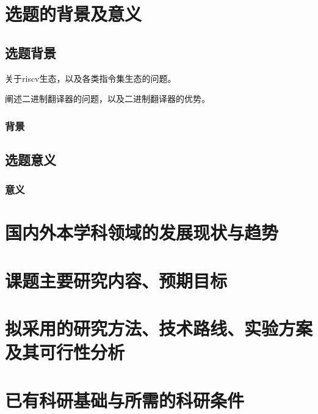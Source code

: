 \section{选题的背景及意义}

\subsection{选题背景}

关于riscv生态，以及各类指令集生态的问题。

阐述二进制翻译器的问题，以及二进制翻译器的优势。



\subsubsection{背景}


\subsection{选题意义}



\subsubsection{意义}



\section{国内外本学科领域的发展现状与趋势}



\section{课题主要研究内容、预期目标}



\section{拟采用的研究方法、技术路线、实验方案及其可行性分析}



\section{已有科研基础与所需的科研条件}



